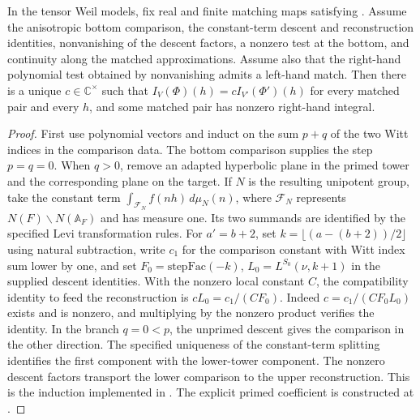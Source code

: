 \begin{proposition}\label{geo:theta}
In the tensor Weil models, fix real and finite matching maps satisfying . Assume the anisotropic bottom comparison, the constant-term descent and reconstruction identities, nonvanishing of the descent factors, a nonzero test at the bottom, and continuity along the matched approximations. Assume also that the right-hand polynomial test obtained by nonvanishing admits a left-hand match. Then there is a unique \(c\in\mathbb C^\times\) such that \(I_V(\Phi)(h)=cI_{V'}(\Phi')(h)\) for every matched pair and every \(h\), and some matched pair has nonzero right-hand integral.
\end{proposition}
\begin{proof}
First use polynomial vectors and induct on the sum \(p+q\) of the two Witt indices in the comparison data. The bottom comparison supplies the step \(p=q=0\). When \(q>0\), remove an adapted hyperbolic plane in the primed tower and the corresponding plane on the target. If \(N\) is the resulting unipotent group, take the constant term \(\int_{\mathcal F_N} f(nh)\,d\mu_N(n)\), where \(\mathcal F_N\) represents \(N(F)\backslash N(\mathbb A_F)\) and has measure one. Its two summands are identified by the specified Levi transformation rules. For \(a'=b+2\), set \(k=\lfloor(a-(b+2))/2\rfloor\) using natural subtraction, write \(c_1\) for the comparison constant with Witt index sum lower by one, and set \(F_0=\mathrm{stepFac}(-k)\), \(L_0=L^{S_0}(\nu,k+1)\) in the supplied descent identities. With the nonzero local constant \(C\), the compatibility identity to feed the reconstruction is \(cL_0=c_1/(CF_0)\). Indeed \(c=c_1/(CF_0L_0)\) exists and is nonzero, and multiplying by the nonzero product verifies the identity. In the branch \(q=0<p\), the unprimed descent gives the comparison in the other direction. The specified uniqueness of the constant-term splitting identifies the first component with the lower-tower component. The nonzero descent factors transport the lower comparison to the upper reconstruction. This is the induction implemented in . The explicit primed coefficient is constructed at .


\end{proof}
